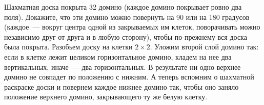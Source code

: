 \problem
Шахматная доска покрыта 32 домино (каждое домино покрывает ровно два поля).
Докажите, что эти домино можно повернуть на 90 или на 180 градусов
(каждое~--- вокруг центра одной из закрываемых им клеток, поворачивать можно
независимо друг от друга и в любую сторону), чтобы по-прежнему вся доска была
покрыта.
\solution
Разобьем доску на клетки $2 \times 2$.
Уложим второй слой домино так: если в клетке лежит целиком горизонтальное
домино, кладем на нее два вертикальных, иначе~--- два горизонтальных.
В результате ни одно верхнее домино не совпадет по положению с нижним.
А теперь вспомним о шахматной раскраске доски и повернем каждое нижнее домино
так, чтобы оно заняло положение верхнего домино, закрывающего ту же белую
клетку.
\endproblem
